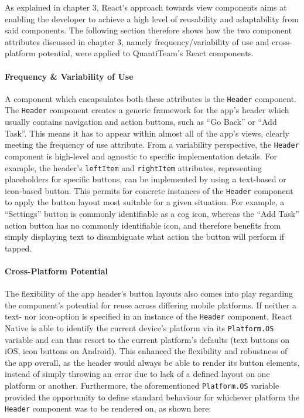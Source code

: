 As explained in chapter 3, React's approach towards view components aims
at enabling the developer to achieve a high level of reusability and
adaptability from said components. The following section therefore shows
how the two component attributes discussed in chapter 3, namely
frequency/variability of use and cross-platform potential, were applied
to QuantiTeam's React components.

\paragraph{Frequency \& Variability of
Use}\label{frequency-variability-of-use}

A component which encapsulates both these attributes is the
\texttt{Header} component. The \texttt{Header} component creates a
generic framework for the app's header which usually contains navigation
and action buttons, such as ``Go Back'' or ``Add Task''. This means it
has to appear within almost all of the app's views, clearly meeting the
frequency of use attribute. From a variability perspective, the
\texttt{Header} component is high-level and agnostic to specific
implementation details. For example, the header's \texttt{leftItem} and
\texttt{rightItem} attributes, representing placeholders for specific
buttons, can be implemented by using a text-based or icon-based button. This permits for
concrete instances of the \texttt{Header} component to apply the button
layout most suitable for a given situation. For example, a ``Settings''
button is commonly identifiable as a cog icon, whereas the ``Add Task''
action button has no commonly identifiable icon, and therefore benefits
from simply displaying text to disambiguate what action the button will
perform if tapped.

\paragraph{Cross-Platform Potential}\label{cross-platform-potential}

The flexibility of the app header's button layouts also comes into play
regarding the component's potential for reuse across differing mobile
platforms. If neither a text- nor icon-option is specified in an
instance of the \texttt{Header} component, React Native is able to
identify the current device's platform via its \texttt{Platform.OS}
variable and can thus resort to the current platform's defaults (text
buttons on iOS, icon buttons on Android). This enhanced the flexibility
and robustness of the app overall, as the header would always be able to
render its button elements, instead of simply throwing an error due to
lack of a defined layout on one platform or another. Furthermore, the
aforementioned \texttt{Platform.OS} variable provided the opportunity to
define standard behaviour for whichever platform the \texttt{Header}
component was to be rendered on, as shown here:

